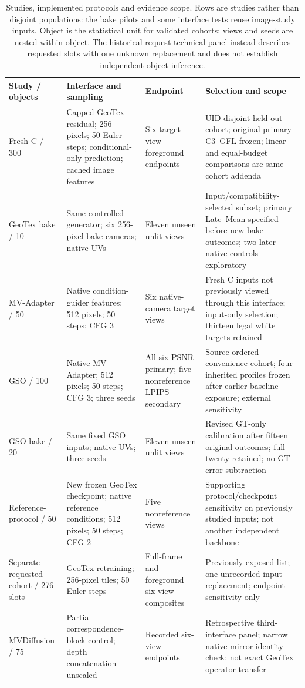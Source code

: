 \documentclass[times,twocolumn,final]{elsarticle}
\begin{document}
\begin{table}[t]
\centering\scriptsize\setlength{\tabcolsep}{3pt}
\caption{Studies, implemented protocols and evidence scope. Rows are studies rather than disjoint populations: the bake pilots and some interface tests reuse image-study inputs. Object is the statistical unit for validated cohorts; views and seeds are nested within object. The historical-request technical panel instead describes requested slots with one unknown replacement and does not establish independent-object inference.}
\label{tab:study-design}
\begin{tabular}{p{}p{}p{}p{}}
\toprule Study / objects & Interface and sampling & Endpoint & Selection and scope \\
\midrule
Fresh C / 300 & Capped GeoTex residual; 256 pixels; 50 Euler steps; conditional-only prediction; cached image features & Six target-view foreground endpoints & UID-disjoint held-out cohort; original primary C3--GFL frozen; linear and equal-budget comparisons are same-cohort addenda \\
GeoTex bake / 10 & Same controlled generator; six 256-pixel bake cameras; native UVs & Eleven unseen unlit views & Input/compatibility-selected subset; primary Late--Mean specified before new bake outcomes; two later native controls exploratory \\
MV-Adapter / 50 & Native condition-guider features; 512 pixels; 50 steps; CFG 3 & Six native-camera target views & Fresh C inputs not previously viewed through this interface; input-only selection; thirteen legal white targets retained \\
GSO / 100 & Native MV-Adapter; 512 pixels; 50 steps; CFG 3; three seeds & All-six PSNR primary; five nonreference LPIPS secondary & Source-ordered convenience cohort; four inherited profiles frozen after earlier baseline exposure; external sensitivity \\
GSO bake / 20 & Same fixed GSO inputs; native UVs; three seeds & Eleven unseen unlit views & Revised GT-only calibration after fifteen original outcomes; full twenty retained; no GT-error subtraction \\
Reference-protocol / 50 & New frozen GeoTex checkpoint; native reference conditions; 512 pixels; 50 steps; CFG 2 & Five nonreference views & Supporting protocol/checkpoint sensitivity on previously studied inputs; not another independent backbone \\
Separate requested cohort / 276 slots & GeoTex retraining; 256-pixel tiles; 50 Euler steps & Full-frame and foreground six-view composites & Previously exposed list; one unrecorded input replacement; endpoint sensitivity only \\
MVDiffusion / 75 & Partial correspondence-block control; depth concatenation unscaled & Recorded six-view endpoints & Retrospective third-interface panel; narrow native-mirror identity check; not exact GeoTex operator transfer \\
\bottomrule
\end{tabular}
\end{table}
\end{document}
